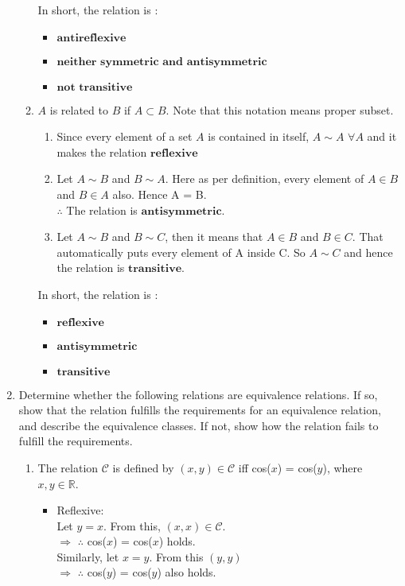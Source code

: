 \documentclass{article}
\newcommand{\R}{\mathbb{R}}
\begin{document}
\begin{enumerate}
\begin{enumerate}
In short, the relation is :
\begin{itemize}
    \item $\textbf{antireflexive}$
    \item $\textbf{neither symmetric and antisymmetric}$
    \item $\textbf{not transitive}$
\end{itemize}

\pagebreak %

    \item $A$ is related to $B$ if $A \subset B$. Note 
    that this notation means proper subset.
    \begin{enumerate}
        \item Since every element of a set $A$ is contained in itself, $A \sim A$ $\forall A$
        and it makes the relation $\textbf{reflexive}$
        \item Let $A \sim B$ and $B \sim A$. Here as per definition, every element of $A \in B$ 
        and  $B \in A$ also. Hence A = B. \\$\therefore$ The relation is $\textbf{antisymmetric}$.
        \item  Let $A \sim B$ and $B \sim C$, then it means that $A \in B$ and $B \in C$. That automatically puts 
        every element of A inside C. So $A \sim C$ and hence the relation is $\textbf{transitive}$.
    \end{enumerate}
    In short, the relation is :
\begin{itemize}
    \item $\textbf{reflexive}$
    \item $\textbf{antisymmetric}$
    \item $\textbf{transitive}$
\end{itemize}
\end{enumerate}

\pagebreak %

\item Determine whether the following relations are equivalence relations. 
If so, show that the relation fulfills the requirements for an equivalence relation, 
and describe the equivalence classes. If not, show how the relation fails to fulfill 
the requirements.

\begin{enumerate}
    \item The relation $\mathcal{C}$ is defined by $(x,y)\in \mathcal{C}$ iff cos($x$) = cos($y$), 
    where $x,y \in \R$.
    \begin{itemize}
        \item Reflexive:\\ Let $y = x$. From this, $(x,x) \in \mathcal{C}$.\\ 
        $\Rightarrow$ $\therefore$ cos($x$) = cos($x$) holds.\\
        Similarly, let $x = y$. From this $(y,y)$\\ 
        $\Rightarrow$ $\therefore$ cos($y$) = cos($y$) also holds. 


\end{itemize}
\end{enumerate}
\end{enumerate}
\end{document}
